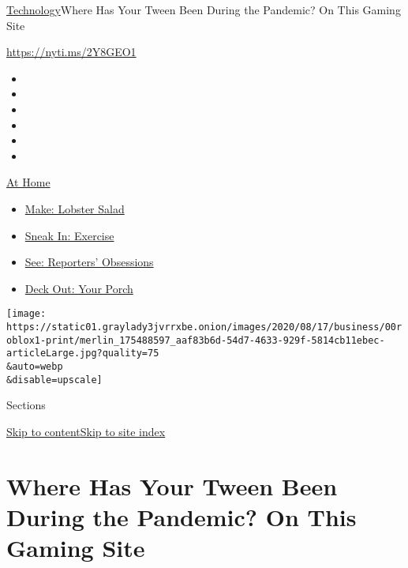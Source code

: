 \href{/section/technology}{Technology}\textbar{}Where Has Your Tween
Been During the Pandemic? On This Gaming Site

\url{https://nyti.ms/2Y8GEO1}

\begin{itemize}
\item
\item
\item
\item
\item
\item
\end{itemize}

\href{https://www.nytimes3xbfgragh.onion/spotlight/at-home?action=click\&pgtype=Article\&state=default\&region=TOP_BANNER\&context=at_home_menu}{At
Home}

\begin{itemize}
\tightlist
\item
  \href{https://www.nytimes3xbfgragh.onion/2020/08/14/dining/lobster-salad-recipe.html?action=click\&pgtype=Article\&state=default\&region=TOP_BANNER\&context=at_home_menu}{Make:
  Lobster Salad}
\item
  \href{https://www.nytimes3xbfgragh.onion/2020/08/15/at-home/coronavirus-at-home-quick-exercises.html?action=click\&pgtype=Article\&state=default\&region=TOP_BANNER\&context=at_home_menu}{Sneak
  In: Exercise}
\item
  \href{https://www.nytimes3xbfgragh.onion/interactive/2020/at-home/even-more-reporters-editors-diaries-lists-recommendations.html?action=click\&pgtype=Article\&state=default\&region=TOP_BANNER\&context=at_home_menu}{See:
  Reporters' Obsessions}
\item
  \href{https://www.nytimes3xbfgragh.onion/2020/08/15/at-home/coronavirus-fall-patio-furniture.html?action=click\&pgtype=Article\&state=default\&region=TOP_BANNER\&context=at_home_menu}{Deck
  Out: Your Porch}
\end{itemize}

\texttt{[image: https://static01.graylady3jvrrxbe.onion/images/2020/08/17/business/00roblox1-print/merlin\_175488597\_aaf83b6d-54d7-4633-929f-5814cb11ebec-articleLarge.jpg?quality=75\\\&auto=webp\\\&disable=upscale]}

Sections

\protect\hyperlink{site-content}{Skip to
content}\protect\hyperlink{site-index}{Skip to site index}

\hypertarget{where-has-your-tween-been-during-the-pandemic-on-this-gaming-site}{%
\section{Where Has Your Tween Been During the Pandemic? On This Gaming
Site}\label{where-has-your-tween-been-during-the-pandemic-on-this-gaming-site}}


